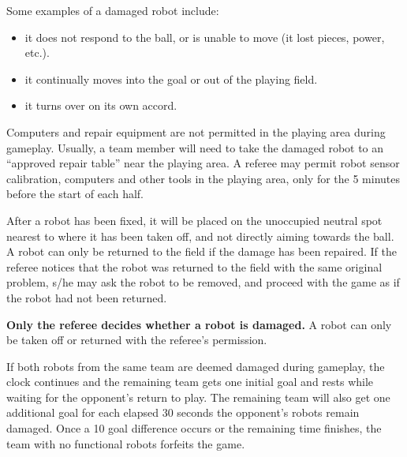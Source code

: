 \documentclass{article}
\begin{document}
Some examples of a damaged robot include:

\begin{itemize}

\item it does not respond to the ball, or is unable to move (it lost pieces,
    power, etc.).

\item it continually moves into the goal or out of the playing field.

\item it turns over on its own accord.

\end{itemize}

Computers and repair equipment are not permitted in the playing area during
gameplay. Usually, a team member will need to take the damaged robot to an
``approved repair table'' near the playing area. A referee may permit robot sensor
calibration, computers and other tools in the playing area, only for the 5
minutes before the start of each half. 

After a robot has been fixed, it will be placed on the unoccupied neutral spot
nearest to where it has been taken off, and not directly aiming towards the
ball. 
A robot can only be returned to the field if the damage has been
repaired. If the referee notices that the robot was returned to the field with
the same original problem, s/he may ask the robot to be removed, and proceed
with the game as if the robot had not been returned.

\textbf{Only the referee decides whether a robot is damaged.} A robot can only
be taken off or returned with the referee's permission.

{
If both robots from the same team are deemed damaged during gameplay, the clock
continues and the remaining team gets one initial goal and rests while waiting
for the opponent's return to play. The remaining team will also get one
additional goal for each elapsed 30 seconds the opponent's robots remain
damaged. Once a 10 goal difference occurs or the remaining time finishes, the
team with no functional robots forfeits the game.
}
\end{document}
